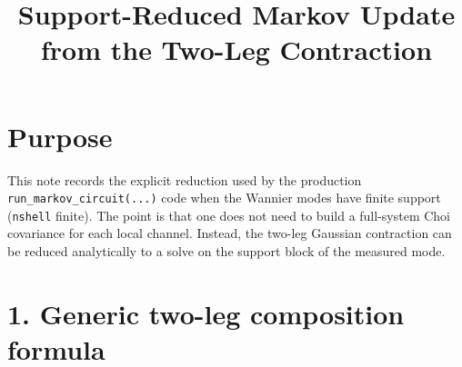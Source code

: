 \documentclass[11pt]{article}
\title{Support-Reduced Markov Update from the Two-Leg Contraction}
\author{}
\date{}
\begin{document}
\maketitle

\section*{Purpose}

This note records the explicit reduction used by the production
\texttt{run\_markov\_circuit(...)} code when the Wannier modes have finite
support (\texttt{nshell} finite). The point is that one does not need to build a
full-system Choi covariance for each local channel. Instead, the two-leg Gaussian
contraction can be reduced analytically to a solve on the support block of the
measured mode.

\section*{1. Generic two-leg composition formula}
\end{document}
